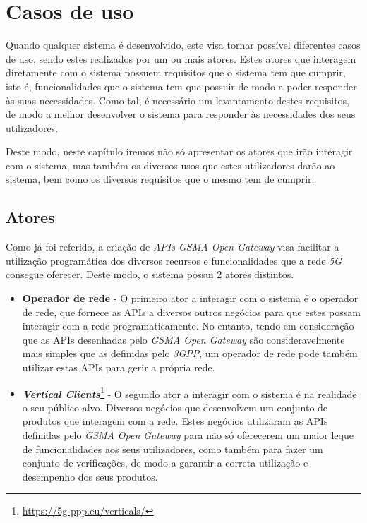 \chapter{Casos de uso}

Quando qualquer sistema é desenvolvido, este visa tornar possível diferentes
casos de uso, sendo estes realizados por um ou mais atores. Estes atores que
interagem diretamente com o sistema possuem requisitos que o sistema tem que
cumprir, isto é, funcionalidades que o sistema tem que possuir de modo a poder
responder às suas necessidades. Como tal, é necessário um levantamento destes
requisitos, de modo a melhor desenvolver o sistema para responder às
necessidades dos seus utilizadores.

Deste modo, neste capítulo iremos não só apresentar os atores que irão
interagir com o sistema, mas também os diversos usos que estes utilizadores
darão ao sistema, bem como os diversos requisitos que o mesmo tem de cumprir.

\section{Atores}

Como já foi referido, a criação de \emph{APIs GSMA Open Gateway} visa facilitar
a utilização programática dos diversos recursos e funcionalidades que a rede
\emph{5G} consegue oferecer. Deste modo, o sistema possui 2 atores distintos.
\begin{itemize} \item \textbf{Operador de rede} - O primeiro ator a interagir
	      com o sistema é o operador de rede, que fornece as APIs a diversos outros
	      negócios para que estes possam interagir com a rede programaticamente. No
	      entanto, tendo em consideração que as APIs desenhadas pelo \emph{GSMA Open
		      Gateway} são consideravelmente mais simples que as definidas pelo
	      \emph{3GPP}, um operador de rede pode também utilizar estas APIs para gerir a
	      própria rede.

	\item \textbf{\emph{Vertical
			      Clients}}\footnote{\url{https://5g-ppp.eu/verticals/}} - O segundo ator a
	      interagir com o sistema é na realidade o seu público alvo. Diversos
	      negócios que desenvolvem um conjunto de produtos que interagem com a rede.
	      Estes negócios utilizaram as APIs definidas pelo \emph{GSMA Open Gateway}
	      para não só oferecerem um maior leque de funcionalidades aos seus
	      utilizadores, como também para fazer um conjunto de verificações, de modo a
	      garantir a correta utilização e desempenho dos seus produtos. \end{itemize}


